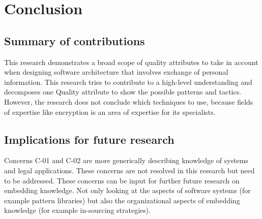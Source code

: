 \chapter{Conclusion}\label{s:conclusion}
\section{Summary of contributions}
This research demonstrates a broad scope of quality attributes to take in account when designing software architecture that involves exchange of personal information. This research tries to contribute to a high-level understanding and decomposes one Quality attribute to show the possible patterns and tactics. However, the research does not conclude which techniques to use, because fields of expertise like encryption is an area of expertise for its specialists.

\section{Implications for future research}\label{Implications}
Concerns C-01 and C-02 are more generically describing knowledge of systems and legal applications. These concerns are not resolved in this research but need to be addressed. These concerns can be input for further future research on embedding knowledge. Not only looking at the aspects of software systems (for example pattern libraries) but also the organizational aspects of embedding knowledge (for example in-sourcing strategies).  

